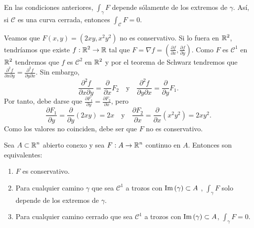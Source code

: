 \begin{colorary}
En las condiciones anteriores, $\displaystyle \int _{\gamma }F  $ depende sólamente de los extremos de $\displaystyle \gamma  $. Así, si $\displaystyle \mathcal{C}  $ es una curva cerrada, entonces $\displaystyle \int _{\mathcal{C} }F = 0 $.
\end{colorary}
\begin{eg}
Veamos que $\displaystyle F\left(x,y\right)=\left(2xy, x^{2}y^{2}\right) $ no es conservativo. Si lo fuera en $\displaystyle \mathbb{R}^{2} $, tendríamos que existe $\displaystyle f : \mathbb{R}^{2}\to \mathbb{R} $ tal que $\displaystyle F = \nabla f = \left(\frac{\partial f}{\partial x}, \frac{\partial f}{\partial y}\right) $. 
Como $\displaystyle F $ es $\displaystyle \mathcal{C}^{1} $ en $\displaystyle \mathbb{R}^{2} $ tendremos que $\displaystyle f $ es $\displaystyle \mathcal{C}^{2} $ en $\displaystyle \mathbb{R}^{2} $ y por el teorema de Schwarz tendremos que $\displaystyle \frac{\partial ^{2}f}{\partial x \partial y}= \frac{\partial ^{2}f}{\partial y\partial x} $. Sin embargo,
\[\frac{\partial ^{2}f}{\partial x \partial y}= \frac{\partial }{\partial x}F_{2} \quad \text{y} \quad \frac{\partial ^{2}f}{\partial y \partial x}= \frac{\partial }{\partial y}F_{1} .\]
Por tanto, debe darse que $\displaystyle \frac{\partial F_{1}}{\partial y}=\frac{\partial F_{2}}{\partial x} $, pero
\[\frac{\partial F_{1}}{\partial y}=\frac{\partial }{\partial y }\left(2xy\right)=2x \quad \text{y} \quad \frac{\partial F_{2}}{\partial x}=\frac{\partial }{\partial x}\left(x^{2}y^{2}\right)=2xy^{2} .\]
Como los valores no coinciden, debe ser que $\displaystyle F $ no es conservativo.
\end{eg}
\begin{theorem}
Sea $\displaystyle A \subset \mathbb{R}^{n} $ abierto conexo y sea $\displaystyle F : A \to \mathbb{R}^{n} $ continuo en $\displaystyle A $. Entonces son equivalentes:
\begin{enumerate}
\item $\displaystyle F $ es conservativo.
\item Para cualquier camino $\displaystyle \gamma  $ que sea $\displaystyle \mathcal{C}^{1} $ a trozos con $\displaystyle \operatorname{Im}\left(\gamma \right)\subset A $ , $\displaystyle \int _{\gamma }F $ solo depende de los extremos de $\displaystyle \gamma  $. 
\item Para cualquier camino cerrado que sea $\displaystyle \mathcal{C}^{1} $ a trozos con $\displaystyle \operatorname{Im}\left(\gamma \right)\subset A $, $\displaystyle \int _{\gamma}F =0 $. 	
\end{enumerate}
\end{theorem}
